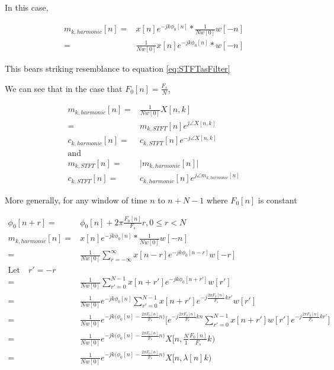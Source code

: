 \documentclass [11pt, proquest] {uwthesis}[2015/03/03]
\begin{document}
In this case,

\begin{align}
m_{k,harmonic}[n] =& x[n] e^{-jk\phi_0 [n]} *  \frac{1}{Nw[0]} w[-n] \nonumber \\
=& \frac{1}{Nw[0]} x[n] e^{-jk\phi_0 [n]} *  w[-n]
\end{align}

This bears striking resemblance to equation \ref{eq:STFTasFilter}

We can see that in the case that $F_0[n] = \frac{F_s}{N}$,

\begin{align}
m_{k,harmonic}[n] =& \frac{1}{Nw[0]} X[n,k] \nonumber \\
=& m_{k,STFT}[n] e^{j \angle X[n,k]} \\
c_{k,harmonic}[n] =& c_{k,STFT}[n] e^{-j \angle X[n,k]} \\
\textrm{and} \nonumber \\
m_{k,STFT}[n] =& \vert m_{k,harmonic}[n] \vert \\
c_{k,STFT}[n] =& c_{k,harmonic}[n] e^{j \angle m_{k,harmonic}[n]}
\end{align}

More generally, for any window of time $n$ to $n + N - 1$ where $F_0[n]$ is constant

\begin{align}
\phi_0[n + r] =& \phi_0[n] + 2\pi \frac{F_0[n]}{F_s}r, 0 \leq r < N \\
m_{k,harmonic}[n] =& x[n] e^{-jk\phi_0 [n]} *  \frac{1}{Nw[0]} w[-n] \nonumber \\
=& \frac{1}{Nw[0]} \sum_{r = -\infty}^\infty x[n - r] e^{-jk\phi_0 [n-r]} w[-r] \nonumber \\
\textrm{Let} \quad r' = -r \nonumber \\
=& \frac{1}{Nw[0]} \sum_{r' = 0}^{N-1} x[n + r'] e^{-jk\phi_0 [n + r']} w[r'] \nonumber \\
=& \frac{1}{Nw[0]} e^{-jk \phi_0[n]} \sum_{r' = 0}^{N-1} x[n + r'] e^{-j \frac{2\pi F_0[n]}{F_s}kr'} w[r'] \nonumber \\
=& \frac{1}{Nw[0]} e^{-jk \Big(\phi_0[n] - \frac{2\pi F_0[n]}{F_s}n \Big)} \Bigg[ e^{-j \frac{2\pi F_0[n]}{F_s}kn} \sum_{r' = 0}^{N-1} x[n + r'] w[r'] e^{-j \frac{2\pi F_0[n]}{F_s}kr'} \Bigg] \nonumber \\
=& \frac{1}{Nw[0]} e^{-jk \Big(\phi_0[n] - \frac{2\pi F_0[n]}{F_s}n \Big)} X[n, \frac{N}{1} \frac{F_0[n]}{F_s} k) \nonumber \\
\label{eq:harmonic-to-stft}
=& \frac{1}{Nw[0]} e^{-jk \Big(\phi_0[n] - \frac{2\pi F_0[n]}{F_s}n \Big)} X[n, \lambda[n]k)
\end{align}
\end{document}
